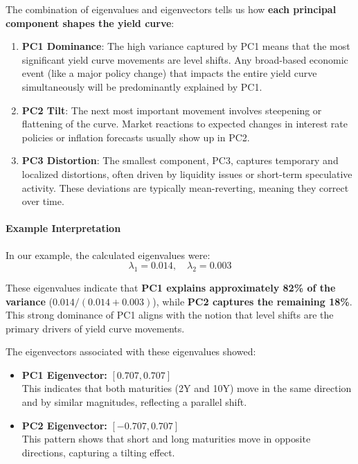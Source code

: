 \documentclass[12pt]{article}
\begin{document}
The combination of eigenvalues and eigenvectors tells us how \textbf{each principal component shapes the yield curve}:
\begin{enumerate}
    \item \textbf{PC1 Dominance}: The high variance captured by PC1 means that the most significant yield curve movements are level shifts. Any broad-based economic event (like a major policy change) that impacts the entire yield curve simultaneously will be predominantly explained by PC1.
    \item \textbf{PC2 Tilt}: The next most important movement involves steepening or flattening of the curve. Market reactions to expected changes in interest rate policies or inflation forecasts usually show up in PC2.
    \item \textbf{PC3 Distortion}: The smallest component, PC3, captures temporary and localized distortions, often driven by liquidity issues or short-term speculative activity. These deviations are typically mean-reverting, meaning they correct over time.
\end{enumerate}

\paragraph{Example Interpretation}

In our example, the calculated eigenvalues were:
\[
\lambda_1 = 0.014, \quad \lambda_2 = 0.003
\]

These eigenvalues indicate that \textbf{PC1 explains approximately 82\% of the variance} (\(0.014 / (0.014 + 0.003)\)), while \textbf{PC2 captures the remaining 18\%}. This strong dominance of PC1 aligns with the notion that level shifts are the primary drivers of yield curve movements.

The eigenvectors associated with these eigenvalues showed:
\begin{itemize}
    \item \textbf{PC1 Eigenvector:} \([0.707, 0.707]\) \\
    This indicates that both maturities (2Y and 10Y) move in the same direction and by similar magnitudes, reflecting a parallel shift.
    \item \textbf{PC2 Eigenvector:} \([-0.707, 0.707]\) \\
    This pattern shows that short and long maturities move in opposite directions, capturing a tilting effect.
\end{itemize}
\end{document}
